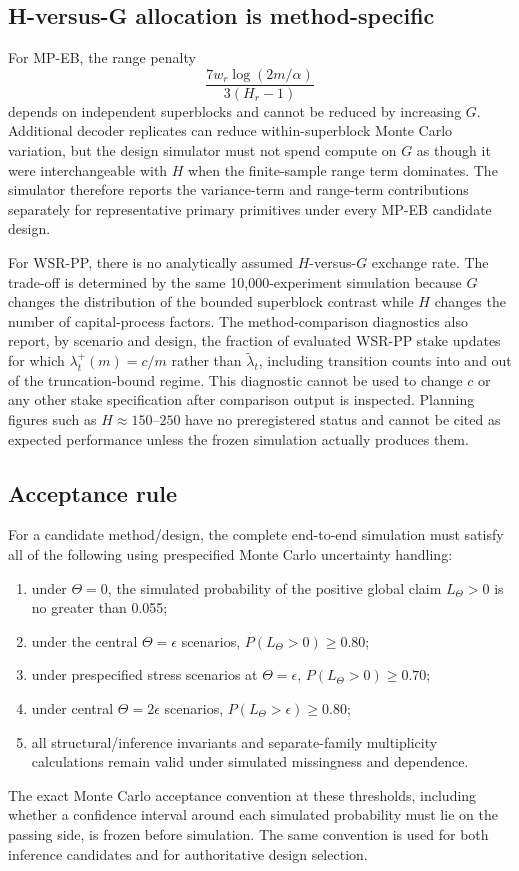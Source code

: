 \documentclass[11pt,a4paper]{article}
\begin{document}
\subsection{H-versus-G allocation is method-specific}
For MP-EB, the range penalty
\[
\frac{7w_r\log(2m/\alpha)}{3(H_r-1)}
\]
depends on independent superblocks and cannot be reduced by increasing $G$. Additional decoder replicates can reduce within-superblock Monte Carlo variation, but the design simulator must not spend compute on $G$ as though it were interchangeable with $H$ when the finite-sample range term dominates. The simulator therefore reports the variance-term and range-term contributions separately for representative primary primitives under every MP-EB candidate design.

For WSR-PP, there is no analytically assumed $H$-versus-$G$ exchange rate. The trade-off is determined by the same 10,000-experiment simulation because $G$ changes the distribution of the bounded superblock contrast while $H$ changes the number of capital-process factors. The method-comparison diagnostics also report, by scenario and design, the fraction of evaluated WSR-PP stake updates for which $\lambda_t^+(m)=c/m$ rather than $\widetilde\lambda_t$, including transition counts into and out of the truncation-bound regime. This diagnostic cannot be used to change $c$ or any other stake specification after comparison output is inspected. Planning figures such as $H\approx150$--$250$ have no preregistered status and cannot be cited as expected performance unless the frozen simulation actually produces them.

\subsection{Acceptance rule}
For a candidate method/design, the complete end-to-end simulation must satisfy all of the following using prespecified Monte Carlo uncertainty handling:
\begin{enumerate}
\item under $\Theta=0$, the simulated probability of the positive global claim $L_\Theta>0$ is no greater than 0.055;
\item under the central $\Theta=\epsilon$ scenarios, $P(L_\Theta>0)\ge0.80$;
\item under prespecified stress scenarios at $\Theta=\epsilon$, $P(L_\Theta>0)\ge0.70$;
\item under central $\Theta=2\epsilon$ scenarios, $P(L_\Theta>\epsilon)\ge0.80$;
\item all structural/inference invariants and separate-family multiplicity calculations remain valid under simulated missingness and dependence.
\end{enumerate}
The exact Monte Carlo acceptance convention at these thresholds, including whether a confidence interval around each simulated probability must lie on the passing side, is frozen before simulation. The same convention is used for both inference candidates and for authoritative design selection.
\end{document}
